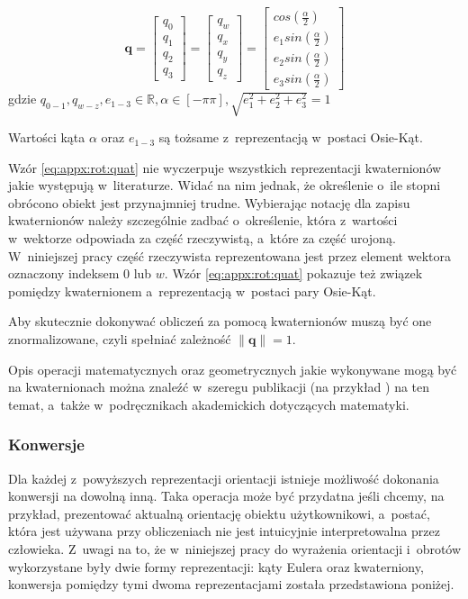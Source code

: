 \begin{equation}
	\label{eq:appx:rot:quat}
	\mathbf{q} =
	\begin{bmatrix}
		q_0 \\
		q_1 \\
		q_2 \\
		q_3 
	\end{bmatrix} 
	= 	
	\begin{bmatrix}
		q_w \\
		q_x \\
		q_y \\
		q_z 
	\end{bmatrix} 
	= 
	\begin{bmatrix}
		cos(\frac{\alpha}{2})    \\
		e_1sin(\frac{\alpha}{2}) \\
		e_2sin(\frac{\alpha}{2}) \\
		e_3sin(\frac{\alpha}{2}) 
	\end{bmatrix}
\end{equation}
gdzie $q_{0-1}, q_{w-z}, e_{1-3} \in \mathbb{R}, \alpha \in [-\pi \pi], \sqrt{e_1^2 + e_2^2 + e_3^2} = 1$
																													
Wartości kąta $\alpha$ oraz $e_{1-3}$ są tożsame z~reprezentacją w~postaci Osie-Kąt.
																													
Wzór \ref{eq:appx:rot:quat} nie wyczerpuje wszystkich reprezentacji kwaternionów jakie występują w~literaturze. Widać na nim jednak, że określenie o~ile stopni obrócono obiekt jest przynajmniej trudne. Wybierając notację dla zapisu kwaternionów należy szczególnie zadbać o~określenie, która z~wartości w~wektorze odpowiada za część rzeczywistą, a~które za część urojoną. W~niniejszej pracy część rzeczywista reprezentowana jest przez element wektora oznaczony indeksem $0$ lub $w$. Wzór \ref{eq:appx:rot:quat} pokazuje też związek pomiędzy kwaternionem a~reprezentacją w~postaci pary Osie-Kąt.
																													
Aby skutecznie dokonywać obliczeń za pomocą kwaternionów muszą być one znormalizowane, czyli spełniać zależność $\|\mathbf{q}\| = 1$.
																													
Opis operacji matematycznych oraz geometrycznych jakie wykonywane mogą być na kwaternionach można znaleźć w~szeregu publikacji (na przykład \cite{Dantam2014}) na ten temat, a~także w~podręcznikach akademickich dotyczących matematyki.
																													
\subsubsection*{Konwersje}
Dla każdej z~powyższych reprezentacji orientacji istnieje możliwość dokonania konwersji na dowolną inną. Taka operacja może być przydatna jeśli chcemy, na przykład, prezentować aktualną orientację obiektu użytkownikowi, a~postać, która jest używana przy obliczeniach nie jest intuicyjnie interpretowalna przez człowieka. Z~uwagi na to, że w~niniejszej pracy do wyrażenia orientacji i~obrotów wykorzystane były dwie formy reprezentacji: kąty Eulera oraz kwaterniony, konwersja pomiędzy tymi dwoma reprezentacjami została przedstawiona poniżej.
																													
